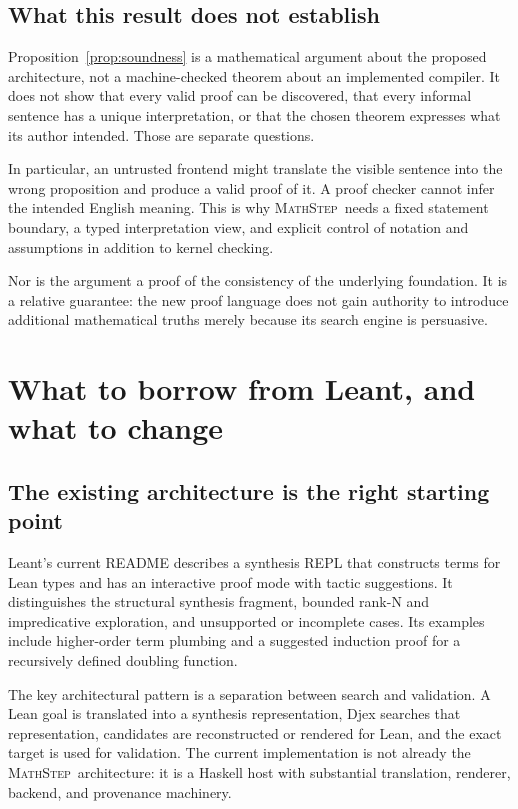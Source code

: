 \documentclass[11pt,a4paper]{article}
\theoremstyle{remark}
\newcommand{\ms}{\textsc{MathStep}}
\begin{document}
\subsection{What this result does not establish}
Proposition~\ref{prop:soundness} is a mathematical argument about the proposed architecture, not a machine-checked theorem about an implemented compiler. It does not show that every valid proof can be discovered, that every informal sentence has a unique interpretation, or that the chosen theorem expresses what its author intended. Those are separate questions.

In particular, an untrusted frontend might translate the visible sentence into the wrong proposition and produce a valid proof of it. A proof checker cannot infer the intended English meaning. This is why \ms\ needs a fixed statement boundary, a typed interpretation view, and explicit control of notation and assumptions in addition to kernel checking.

Nor is the argument a proof of the consistency of the underlying foundation. It is a relative guarantee: the new proof language does not gain authority to introduce additional mathematical truths merely because its search engine is persuasive.

\section{What to borrow from Leant, and what to change}\label{sec:leant}

\subsection{The existing architecture is the right starting point}
Leant's current README describes a synthesis REPL that constructs terms for Lean types and has an interactive proof mode with tactic suggestions. It distinguishes the structural synthesis fragment, bounded rank-N and impredicative exploration, and unsupported or incomplete cases. Its examples include higher-order term plumbing and a suggested induction proof for a recursively defined doubling function.\cite{leant-readme}

The key architectural pattern is a separation between search and validation. A Lean goal is translated into a synthesis representation, Djex searches that representation, candidates are reconstructed or rendered for Lean, and the exact target is used for validation. The current implementation is not already the \ms\ architecture: it is a Haskell host with substantial translation, renderer, backend, and provenance machinery.\cite{leant-internals,leant-fragment}
\end{document}
